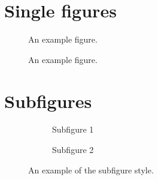 \documentclass[11pt]{article}
\begin{document}
\section{Single figures}

\blindtext
\blindtext

\begin{figure}[h!]
\centering 

\caption{An example figure.}
\end{figure}

\blindtext
\blindtext

\begin{figure}[h!]
\centering 

\caption{An example figure.}
\end{figure}

\blindtext
\blindtext

\section{Subfigures}

\blindtext
\blindtext

\begin{figure}[h!]
\centering
    \begin{subfigure}[b]{0.49\textwidth}
    \centering
    
    \caption{Subfigure 1}
    \end{subfigure}\hfill
    \begin{subfigure}[b]{0.49\textwidth}
    \centering
    
    \caption{Subfigure 2}
    \end{subfigure}
\caption{An example of the subfigure style.}
\end{figure}

\blindtext
\end{document}
